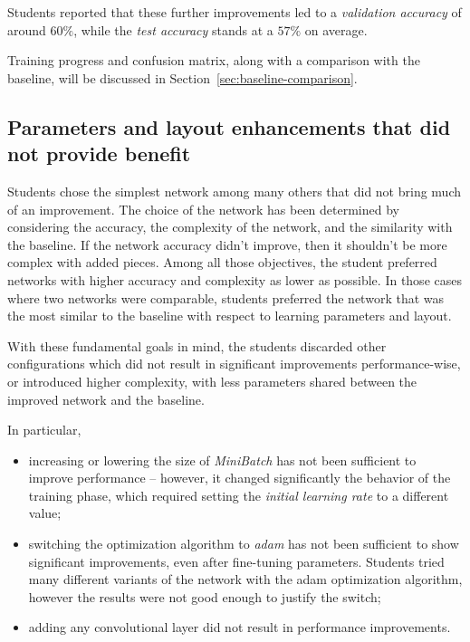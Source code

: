 \documentclass[a4paper, 11pt]{article} %
\begin{document}
Students reported that these further improvements led to a \emph{validation accuracy} of around $60\%$, while the \emph{test accuracy} stands at a $57\%$ on average.

Training progress and confusion matrix, along with a comparison with the baseline, will be discussed in Section~\ref{sec:baseline-comparison}.

\subsection{Parameters and layout enhancements that did not provide benefit}\label{sec:no-benefits}

Students chose the simplest network among many others that did not bring much of an improvement. The choice of the network has been determined by considering the accuracy, the complexity of the network, and the similarity with the baseline. If the network accuracy didn't improve, then it shouldn't be more complex with added pieces. Among all those objectives, the student preferred networks with higher accuracy and complexity as lower as possible. In those cases where two networks were comparable, students preferred the network that was the most similar to the baseline with respect to learning parameters and layout.

With these fundamental goals in mind, the students discarded other configurations which did not result in significant improvements performance-wise, or introduced higher complexity, with less parameters shared between the improved network and the baseline.

In particular,

\begin{itemize}
    \item increasing or lowering the size of \emph{MiniBatch} has not been sufficient to improve performance \--- however, it changed significantly the behavior of the training phase, which required setting the \emph{initial learning rate} to a different value;
    \item switching the optimization algorithm to \emph{adam} has not been sufficient to show significant improvements, even after fine-tuning parameters. Students tried many different variants of the network with the adam optimization algorithm, however the results were not good enough to justify the switch;
    \item adding any convolutional layer did not result in performance improvements.
\end{itemize}
\end{document}
